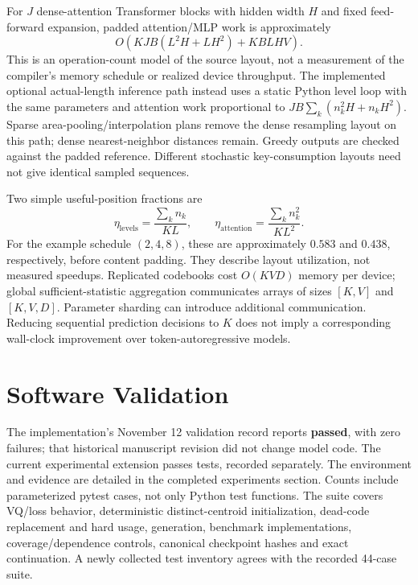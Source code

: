 \documentclass[11pt,a4paper]{article}
\begin{document}
For \(J\) dense-attention Transformer blocks with hidden width \(H\) and
fixed feed-forward expansion, padded attention/MLP work is approximately
\begin{equation}
 O\!\left(KJB(L^2H+LH^2)+KBLHV\right).
\end{equation}
This is an operation-count model of the source layout, not a measurement of
the compiler's memory schedule or realized device throughput. The implemented optional actual-length inference path instead uses a static
Python level loop with the same parameters and attention work proportional to
\(JB\sum_k(n_k^2H+n_kH^2)\). Sparse area-pooling/interpolation plans remove
the dense resampling layout on this path; dense nearest-neighbor distances
remain. Greedy outputs are checked against the padded reference. Different
stochastic key-consumption layouts need not give identical sampled sequences.

Two simple useful-position fractions are
\begin{equation}
 \eta_{\mathrm{levels}}=\frac{\sum_k n_k}{KL},\qquad
 \eta_{\mathrm{attention}}=\frac{\sum_k n_k^2}{KL^2}.
\end{equation}
For the example schedule \((2,4,8)\), these are approximately \(0.583\) and
\(0.438\), respectively, before content padding. They describe layout
utilization, not measured speedups. Replicated codebooks cost \(O(KVD)\) memory
per device; global sufficient-statistic aggregation communicates arrays of
sizes \([K,V]\) and \([K,V,D]\). Parameter sharding can introduce additional
communication. Reducing sequential prediction decisions to \(K\) does not
imply a corresponding wall-clock improvement over token-autoregressive models.

\section{Software Validation}
\label{sec:validation}
The implementation's November 12 validation record reports \textbf{\TestCases{}
passed}, with zero failures; that historical manuscript revision did not change model code.
The current experimental extension passes \CurrentTestCases{} tests, recorded separately.
The environment and evidence are detailed in the completed experiments section.
Counts include parameterized pytest cases, not only Python test functions.
The suite covers VQ/loss behavior, deterministic distinct-centroid initialization,
dead-code replacement and hard usage, generation, benchmark implementations,
coverage/dependence controls, canonical checkpoint hashes and exact continuation.
A newly collected test inventory agrees with the recorded 44-case suite.
\end{document}
